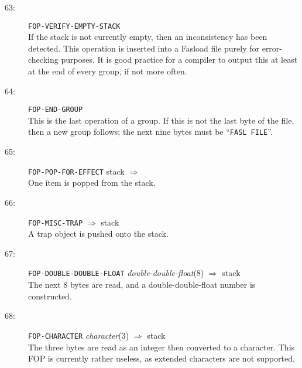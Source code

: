 \begin{description}
\item[63:] \hspace{2em} {\tt FOP-VERIFY-EMPTY-STACK} \\
If the stack is not currently empty,
then an inconsistency has been detected.  This operation
is inserted into a Fasload file purely for error-checking purposes.
It is good practice for a compiler to output this at least at the
end of every group, if not more often.

\item[64:] \hspace{2em} {\tt FOP-END-GROUP} \\
This is the last operation of a group.	If this is not the
last byte of the file, then a new group follows; the next
nine bytes must be ``{\tt FASL FILE}''.

\item[65:] \hspace{2em} {\tt FOP-POP-FOR-EFFECT} \hspace{2em} stack \hspace{2em} $\Rightarrow$ \hspace{2em} \\
One item is popped from the stack.

\item[66:] \hspace{2em} {\tt FOP-MISC-TRAP} \hspace{2em} $\Rightarrow$ \hspace{2em} stack \\
A trap object is pushed onto the stack.

\item[67:] \hspace{2em} {\tt FOP-DOUBLE-DOUBLE-FLOAT} \hspace{2em} {\it double-double-float}(8) \hspace{2em} $\Rightarrow$ \hspace{2em} stack \\
The next 8 bytes are read, and a double-double-float number is constructed.

\item[68:] \hspace{2em} {\tt FOP-CHARACTER} \hspace{2em} {\it character}(3) \hspace{2em} $\Rightarrow$ \hspace{2em} stack \\
The three bytes are read as an integer then converted to a character.  This FOP
is currently rather useless, as extended characters are not supported.


\end{description}
